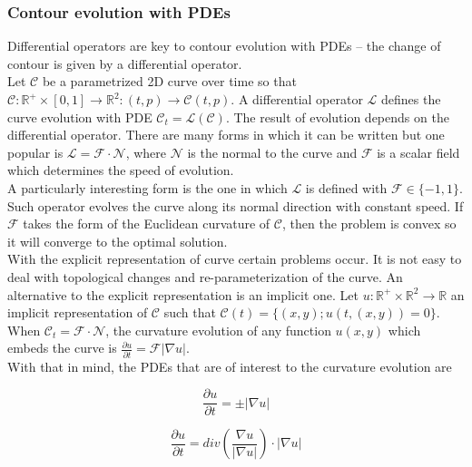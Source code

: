 \subsubsection{Contour evolution with PDEs}

Differential operators are key to contour evolution with PDEs -- the change of contour is given by a differential operator. \\

Let $\mathcal{C}$ be a parametrized 2D curve over time so that $\mathcal{C}: \mathbb{R}^+ \times [0,1] \rightarrow \mathbb{R}^2 : (t,p) \rightarrow \mathcal{C}(t,p)$. A differential operator $\mathcal{L}$ defines the curve evolution with PDE $\mathcal{C}_t = \mathcal{L}(\mathcal{C})$. The result of evolution depends on the differential operator. There are many forms in which it can be written but one popular is $\mathcal{L} = \mathcal{F} \cdot \mathcal{N}$, where $\mathcal{N}$ is the normal to the curve and $\mathcal{F}$ is a scalar field which determines the speed of evolution. \\

A particularly interesting form is the one in which $\mathcal{L}$ is defined with $\mathcal{F} \in \{ -1,1 \}$. Such operator evolves the curve along its normal direction with constant speed. If $\mathcal{F}$ takes the form of the Euclidean curvature of $\mathcal{C}$, then the problem is convex so it will converge to the optimal solution. \\

With the explicit representation of curve certain problems occur. It is not easy to deal with topological changes and re-parameterization of the curve. An alternative to the explicit representation is an implicit one. Let $u: \mathbb{R}^+ \times \mathbb{R}^2 \rightarrow \mathbb{R}$ an implicit representation of $\mathcal{C}$ such that $\mathcal{C}(t) = \{ (x,y); u(t,(x,y)) = 0 \}$. When $\mathcal{C}_t = \mathcal{F} \cdot \mathcal{N}$, the curvature evolution of any function $u(x,y)$ which embeds the curve is $\frac{\partial u}{\partial t} = \mathcal{F}|\nabla u|$. \\

With that in mind, the PDEs that are of interest to the curvature evolution are

\begin{equation}
	\frac{\partial u}{\partial t} = \pm |\nabla u|
	\label{eq:PDE1}
\end{equation}

\begin{equation}
	\frac{\partial u}{\partial t} = div \left ( \frac{\nabla u}{|\nabla u|}  \right ) \cdot |\nabla u|
	\label{eq:PDE2}
\end{equation}

